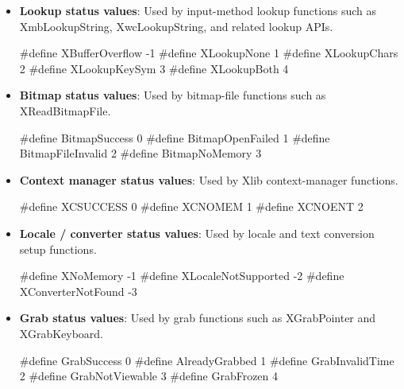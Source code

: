 \documentclass{report}
\begin{document}
    \pagebreak 
    \begin{itemize}
        \bigbreak \noindent 
        \begin{cppcode}
        #define Status int
        \end{cppcode}
        \item \textbf{Lookup status values}: Used by input-method lookup functions such as XmbLookupString, XwcLookupString, and related lookup APIs.
            \bigbreak \noindent 
            \begin{cppcode}
                #define XBufferOverflow   -1
                #define XLookupNone        1
                #define XLookupChars       2
                #define XLookupKeySym      3
                #define XLookupBoth        4
            \end{cppcode}
        \item \textbf{Bitmap status values}: Used by bitmap-file functions such as XReadBitmapFile.
            \bigbreak \noindent 
            \begin{cppcode}
                #define BitmapSuccess       0
                #define BitmapOpenFailed    1
                #define BitmapFileInvalid   2
                #define BitmapNoMemory      3
            \end{cppcode}
        \item \textbf{Context manager status values}: Used by Xlib context-manager functions.
            \bigbreak \noindent 
            \begin{cppcode}
                #define XCSUCCESS   0
                #define XCNOMEM     1
                #define XCNOENT     2
            \end{cppcode}
        \item \textbf{Locale / converter status values}: Used by locale and text conversion setup functions.
            \bigbreak \noindent 
            \begin{cppcode}
                #define XNoMemory              -1
                #define XLocaleNotSupported    -2
                #define XConverterNotFound     -3
            \end{cppcode}
        \item \textbf{Grab status values}: Used by grab functions such as XGrabPointer and XGrabKeyboard.
            \bigbreak \noindent 
            \begin{cppcode}
                #define GrabSuccess       0
                #define AlreadyGrabbed    1
                #define GrabInvalidTime   2
                #define GrabNotViewable   3
                #define GrabFrozen        4
            \end{cppcode}
    \end{itemize}
\end{document}

